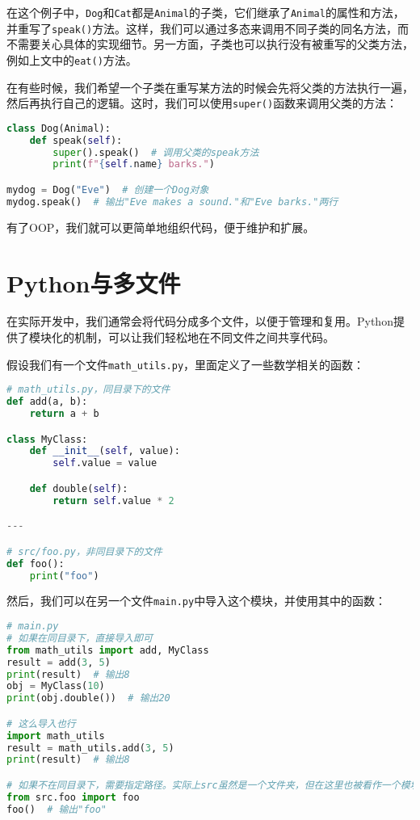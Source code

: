 \documentclass[../main.tex]{subfiles}
\begin{document}
在这个例子中，\texttt{Dog}和\texttt{Cat}都是\texttt{Animal}的子类，它们继承了\texttt{Animal}的属性和方法，并重写了\texttt{speak()}方法。这样，我们可以通过多态来调用不同子类的同名方法，而不需要关心具体的实现细节。另一方面，子类也可以执行没有被重写的父类方法，例如上文中的\texttt{eat()}方法。

在有些时候，我们希望一个子类在重写某方法的时候会先将父类的方法执行一遍，然后再执行自己的逻辑。这时，我们可以使用\texttt{super()}函数来调用父类的方法：
\begin{lstlisting}[language=python]
class Dog(Animal):
    def speak(self):
        super().speak()  # 调用父类的speak方法
        print(f"{self.name} barks.")

mydog = Dog("Eve")  # 创建一个Dog对象
mydog.speak()  # 输出"Eve makes a sound."和"Eve barks."两行
\end{lstlisting}

有了OOP，我们就可以更简单地组织代码，便于维护和扩展。

\section{Python与多文件}

在实际开发中，我们通常会将代码分成多个文件，以便于管理和复用。Python提供了模块化的机制，可以让我们轻松地在不同文件之间共享代码。

假设我们有一个文件\texttt{math\_utils.py}，里面定义了一些数学相关的函数：
\begin{lstlisting}[language=python]
# math_utils.py，同目录下的文件
def add(a, b):
    return a + b

class MyClass:
    def __init__(self, value):
        self.value = value

    def double(self):
        return self.value * 2

---

# src/foo.py，非同目录下的文件
def foo():
    print("foo")
\end{lstlisting}

然后，我们可以在另一个文件\texttt{main.py}中导入这个模块，并使用其中的函数：
\begin{lstlisting}[language=python]
# main.py
# 如果在同目录下，直接导入即可
from math_utils import add, MyClass
result = add(3, 5)
print(result)  # 输出8
obj = MyClass(10)
print(obj.double())  # 输出20

# 这么导入也行
import math_utils
result = math_utils.add(3, 5)
print(result)  # 输出8

# 如果不在同目录下，需要指定路径。实际上src虽然是一个文件夹，但在这里也被看作一个模块
from src.foo import foo 
foo()  # 输出"foo"
\end{lstlisting}
\end{document}
